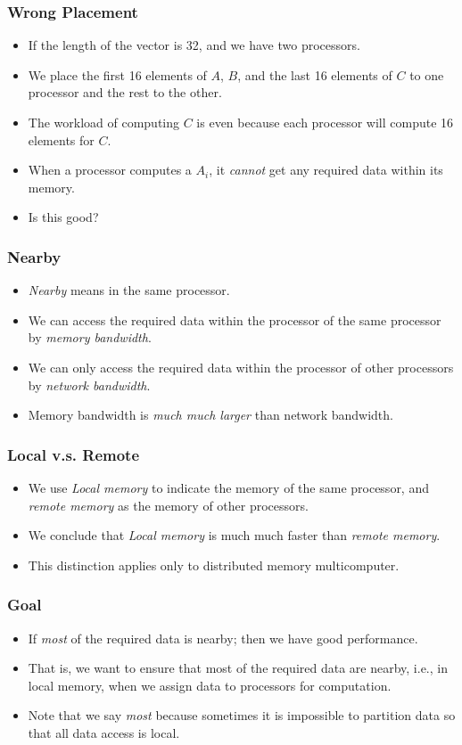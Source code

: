 \documentclass{beamer}
\begin{document}
\begin{CJK}{UTF8}{bsmi}
\begin{frame}
\frametitle{Wrong Placement}
\begin{itemize}
\item If the length of the vector is 32, and we have two processors.
\item We place the first 16 elements of $A$, $B$, and the last 16 elements of $C$ to one processor and the rest to the other.
\item The workload of computing $C$ is even because each processor will compute 16 elements for $C$.
\item When a processor computes a $A_i$, it {\em cannot} get any required data within its memory.
\item Is this good?
\end{itemize}
\end{frame}

\begin{frame}
\frametitle{Nearby}
\begin{itemize}
\item {\em Nearby} means in the same processor.
\item We can access the required data within the processor of the same
  processor by {\em memory bandwidth}.
\item We can only access the required data within the processor of other processors by {\em network bandwidth}.
\item Memory bandwidth is {\em much much larger} than network
  bandwidth.
\end{itemize}
\end{frame}

\begin{frame}
\frametitle{Local v.s. Remote}
\begin{itemize}
\item We use {\em Local memory} to indicate the memory of the same processor, and {\em remote memory} as the memory of other processors.
\item We conclude that {\em Local memory} is much much faster than {\em remote memory}.
\item This distinction applies only to distributed memory multicomputer.
\end{itemize}
\end{frame}

\begin{frame}
\frametitle{Goal}
\begin{itemize}
\item If {\em most} of the required data is nearby; then we have good performance.
\item That is, we want to ensure that most of the required data are nearby, i.e., in local memory, when we assign data to processors for computation.
\item Note that we say {\em most} because sometimes it is impossible to partition data so that all data access is local.
\end{itemize}
\end{frame}


\end{CJK}
\end{document}
